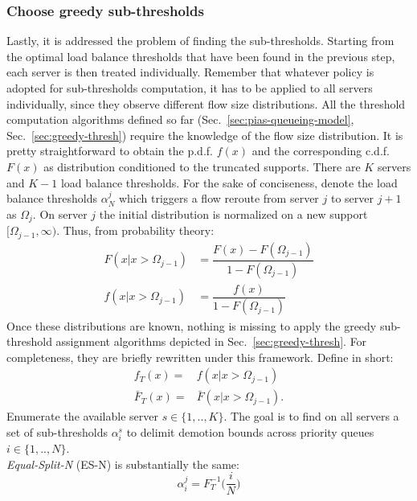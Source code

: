 \subsubsection{Choose greedy sub-thresholds}
\label{sec:subthresh-with-sd}
Lastly, it is addressed the problem of finding the sub-thresholds. Starting from the optimal load balance thresholds that have been found in the previous step, each server is then treated individually. Remember that whatever policy is adopted for sub-thresholds computation, it has to be applied to all servers individually, since they observe different flow size distributions. All the threshold computation algorithms defined so far (Sec.~\ref{sec:pias-queueing-model}, Sec.~\ref{sec:greedy-thresh}) require the knowledge of the flow size distribution. It is pretty straightforward to obtain the p.d.f. $f(x)$ and the corresponding c.d.f. $F(x)$ as distribution conditioned to the truncated supports. There are $K$ servers and $K-1$ load balance thresholds. For the sake of conciseness, denote the load balance thresholds $\alpha_N^j$ which triggers a flow reroute from server $j$ to server $j+1$ as $\Omega_j$. On server $j$ the initial distribution is normalized on a new support $[\Omega_{j-1},\infty)$. Thus, from probability theory:
\begin{equation}
\label{eq:conditionalpdf}
\begin{aligned}
F(x|x>\Omega_{j-1}) &= \dfrac{F(x) - F(\Omega_{j-1})}{1-F(\Omega_{j-1})}  \\
f(x|x>\Omega_{j-1}) &= \dfrac{f(x)}{1-F(\Omega_{j-1})} 
\end{aligned}
\end{equation}
Once these distributions are known, nothing is missing to apply the greedy sub-threshold assignment algorithms depicted in Sec.~\ref{sec:greedy-thresh}. For completeness, they are briefly rewritten under this framework. Define in short:
\begin{align*}
f_T(x) =& f(x|x>\Omega_{j-1})\\
\bar{F}_T(x) =& \bar{F}(x|x>\Omega_{j-1}). 
\end{align*}
Enumerate the available server $s \in \{1,..,K\}$. The goal is to find on all servers a set of sub-thresholds $\alpha_i^s$ to delimit demotion bounds across priority queues $i \in \{1,..,N\}$. \\
\textit{Equal-Split-N} (ES-N) is substantially the same:
\begin{equation}
\alpha_i^j = F_T^{-1}\Big(\frac{i}{N}\Big)
\end{equation}
